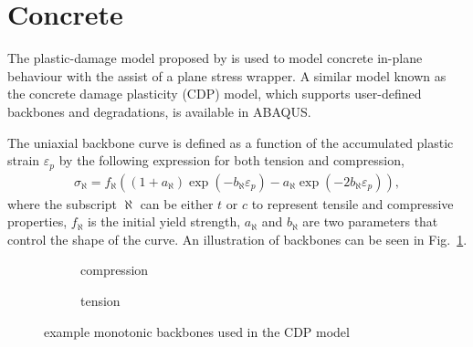 \documentclass[3p,sort&compress,review,11pt,fleqn]{elsarticle}
\newcommand*{\figref}[1]{Fig.~\ref{#1}}
\begin{document}
\section{Concrete}\label{sec:cdp}
The plastic-damage model proposed by \citet{Lee1998} is used to model concrete in-plane behaviour with the assist of a plane stress wrapper. A similar model known as the concrete damage plasticity (CDP) model, which supports user-defined backbones and degradations, is available in ABAQUS.

The uniaxial backbone curve is defined as a function of the accumulated plastic strain $\varepsilon_p$ by the following expression for both tension and compression,
\begin{gather}
\sigma_\aleph=f_\aleph\left(\left(1+a_\aleph\right)\exp\left(-b_\aleph\varepsilon_p\right)-a_\aleph\exp\left(-2b_\aleph\varepsilon_p\right)\right),
\end{gather}
where the subscript $\aleph$ can be either $t$ or $c$ to represent tensile and compressive properties, $f_\aleph$ is the initial yield strength, $a_\aleph$ and $b_\aleph$ are two parameters that control the shape of the curve. An illustration of backbones can be seen in \figref{fig:cdp_backbone}.
\begin{figure}[htb]
\centering\scriptsize
\begin{subfigure}{.48\textwidth}\centering
{}
\caption{compression}
\end{subfigure}\hfill
\begin{subfigure}{.48\textwidth}\centering
{}
\caption{tension}
\end{subfigure}
\caption{example monotonic backbones used in the CDP model}\label{fig:cdp_backbone}
\end{figure}
\end{document}
